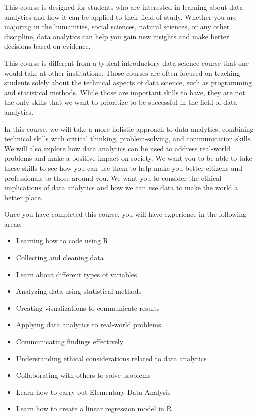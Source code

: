 \documentclass[
  letterpaper,
  DIV=11,
  numbers=noendperiod]{scrreprt}
\providecommand{\tightlist}{%
  \setlength{\itemsep}{0pt}\setlength{\parskip}{0pt}}\usepackage{longtable,booktabs,array}
\begin{document}
This course is designed for students who are interested in learning
about data analytics and how it can be applied to their field of study.
Whether you are majoring in the humanities, social sciences, natural
sciences, or any other discipline, data analytics can help you gain new
insights and make better decisions based on evidence.

This course is different from a typical introductory data science course
that one would take at other institutions. Those courses are often
focused on teaching students solely about the technical aspects of data
science, such as programming and statistical methods. While those are
important skills to have, they are not the only skills that we want to
prioritize to be successful in the field of data analytics.

In this course, we will take a more holistic approach to data analytics,
combining technical skills with critical thinking, problem-solving, and
communication skills. We will also explore how data analytics can be
used to address real-world problems and make a positive impact on
society. We want you to be able to take these skills to see how you can
use them to help make you better citizens and professionals to those
around you. We want you to consider the ethical implications of data
analytics and how we can use data to make the world a better place.

Once you have completed this course, you will have experience in the
following areas:

\begin{itemize}
\tightlist
\item
  Learning how to code using R
\item
  Collecting and cleaning data
\item
  Learn about different types of variables.
\item
  Analyzing data using statistical methods
\item
  Creating visualizations to communicate results
\item
  Applying data analytics to real-world problems
\item
  Communicating findings effectively
\item
  Understanding ethical considerations related to data analytics
\item
  Collaborating with others to solve problems
\item
  Learn how to carry out Elementary Data Analysis
\item
  Learn how to create a linear regression model in R
\end{itemize}
\end{document}
